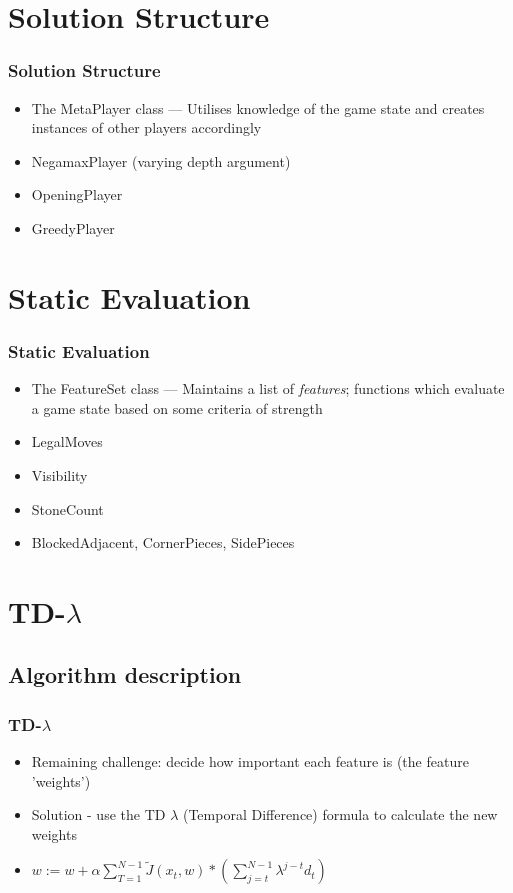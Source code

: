 \documentclass[10pt]{beamer}
\begin{document}
\section{Solution Structure}

\begin{frame}
  \frametitle{Solution Structure}   %
  \begin{itemize}
  \item<1-> The MetaPlayer class --- Utilises knowledge of the game state and 
        creates instances of other players accordingly
  \item<2-> NegamaxPlayer (varying depth argument)
  \item<2-> OpeningPlayer
  \item<2-> GreedyPlayer
  \end{itemize}
\end{frame}

\section{Static Evaluation}

\begin{frame}
  \frametitle{Static Evaluation}   %
  \begin{itemize}
  \item<1-> The FeatureSet class --- Maintains a list of \emph{features}; functions
  which evaluate a game state based on some criteria of strength
  \item<2-> LegalMoves
  \item<2-> Visibility
  \item<2-> StoneCount
  \item<2-> BlockedAdjacent, CornerPieces, SidePieces
  \end{itemize}
\end{frame}

\section{TD-$\lambda$}
\subsection{Algorithm description}
    \begin{frame}
      \frametitle{TD-$\lambda$}
      \begin{itemize}
        \item<1-> Remaining challenge: decide how important each feature is (the feature 'weights')
        \item<2-> Solution - use the TD $\lambda$ (Temporal Difference) formula to calculate the new weights
        \item<2-> $\displaystyle w := w + \alpha \sum_{T=1}^{N-1} \tilde{J}(x_t,w) *( \sum _{j=t} ^{N-1} \lambda ^{j-t} d_t )$ 
      \end{itemize}
    \end{frame}
    
\end{document}
